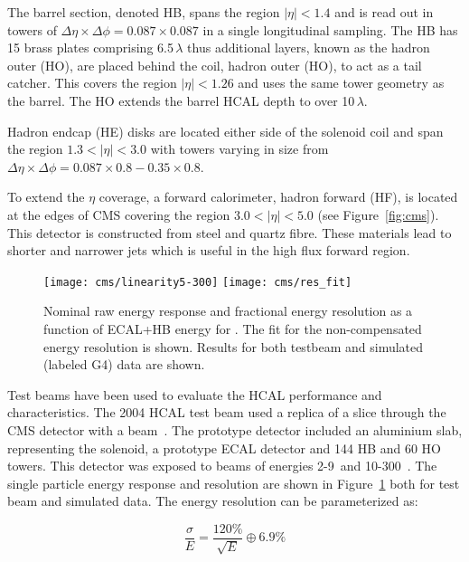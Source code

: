 The barrel section, denoted HB, spans the region $|\eta| < 1.4$ and is read out in towers of $\Delta\eta \times \Delta\phi = 0.087\times0.087$ in a single longitudinal sampling. The HB has 15 brass plates comprising 6.5\,$\lambda$ thus additional layers, known as the hadron outer (HO), are placed behind the coil, hadron outer (HO), to act as a tail catcher. This covers the region $|\eta| < 1.26$ and uses the same tower geometry as the barrel. The HO extends the barrel HCAL depth to over 10\,$\lambda$.
 
Hadron endcap (HE) disks are located either side of the solenoid coil and span the region $1.3 < |\eta| < 3.0$ with towers varying in size from $\Delta\eta \times \Delta\phi = 0.087\times0.8 - 0.35\times0.8$.

To extend the $\eta$ coverage, a forward calorimeter, hadron forward (HF), is located at the edges of CMS covering the region $3.0 < |\eta| < 5.0$ (see Figure~\ref{fig:cms}). This detector is constructed from steel and quartz fibre. These materials lead to shorter and narrower jets which is useful in the high flux forward region.

\begin{figure}[tb]
  \centering
    \texttt{[image: cms/linearity5-300]}
    \texttt{[image: cms/res\_fit]}
    \caption{Nominal raw energy response and fractional energy resolution 
as a function of ECAL+HB energy for \piminus. The fit for the non-compensated
energy resolution is shown. Results for both testbeam and simulated (labeled G4) data are shown.~\cite{CMS_TDR_PHYS_vol1}}
    \label{fig:HCALparticle}
\end{figure}

Test beams have been used to evaluate the HCAL performance and characteristics. The 2004 HCAL test beam used a replica of a slice through the CMS detector with a \piminus beam~\cite{CMS_TDR_PHYS_vol1}. The prototype detector included an aluminium slab, representing the solenoid, a prototype ECAL detector and 144 HB and 60 HO towers. This detector was exposed to \piminus beams of energies 2-9~\GeV and 10-300~\GeV. The single particle energy response and resolution are shown in Figure~\ref{fig:HCALparticle} both for test beam and simulated data. The energy resolution can be parameterized as:

\begin{equation}
	\frac{\sigma}{E}= \frac{120\%}{\sqrt{E}} \oplus 6.9\%
\end{equation}

